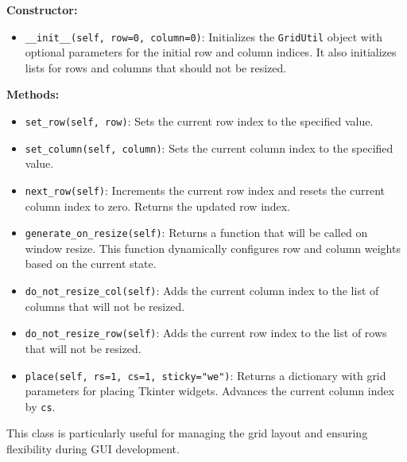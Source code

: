 \textbf{Constructor:}

\begin{itemize}
\item \texttt{\_\_init\_\_(self, row=0, column=0)}: Initializes the \texttt{GridUtil} object with optional parameters for the initial row and column indices. It also initializes lists for rows and columns that should not be resized.
\end{itemize}

\textbf{Methods:}

\begin{itemize}
\item \texttt{set\_row(self, row)}: Sets the current row index to the specified value.
\item \texttt{set\_column(self, column)}: Sets the current column index to the specified value.
\item \texttt{next\_row(self)}: Increments the current row index and resets the current column index to zero. Returns the updated row index.
\item \texttt{generate\_on\_resize(self)}: Returns a function that will be called on window resize. This function dynamically configures row and column weights based on the current state.
\item \texttt{do\_not\_resize\_col(self)}: Adds the current column index to the list of columns that will not be resized.
\item \texttt{do\_not\_resize\_row(self)}: Adds the current row index to the list of rows that will not be resized.
\item \texttt{place(self, rs=1, cs=1, sticky="we")}: Returns a dictionary with grid parameters for placing Tkinter widgets. Advances the current column index by \texttt{cs}.
\end{itemize}

This class is particularly useful for managing the grid layout and ensuring flexibility during GUI development.


